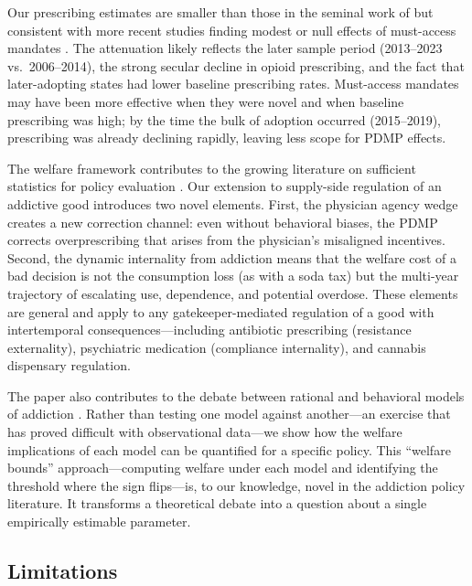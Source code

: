 \documentclass[12pt]{article}
\begin{document}
Our prescribing estimates are smaller than those in the seminal work of \citet{buchmueller2018effect} but consistent with more recent studies finding modest or null effects of must-access mandates \citep{kaestner2019effects, horwitz2021effect, dave2021mandatory, maclean2022prescription}. The attenuation likely reflects the later sample period (2013--2023 vs.\ 2006--2014), the strong secular decline in opioid prescribing, and the fact that later-adopting states had lower baseline prescribing rates. Must-access mandates may have been more effective when they were novel and when baseline prescribing was high; by the time the bulk of adoption occurred (2015--2019), prescribing was already declining rapidly, leaving less scope for PDMP effects.

The welfare framework contributes to the growing literature on sufficient statistics for policy evaluation \citep{chetty2009sufficient, allcott2019regressive, hendren2020unified, atkinson2019welfare}. Our extension to supply-side regulation of an addictive good introduces two novel elements. First, the physician agency wedge creates a new correction channel: even without behavioral biases, the PDMP corrects overprescribing that arises from the physician's misaligned incentives. Second, the dynamic internality from addiction means that the welfare cost of a bad decision is not the consumption loss (as with a soda tax) but the multi-year trajectory of escalating use, dependence, and potential overdose. These elements are general and apply to any gatekeeper-mediated regulation of a good with intertemporal consequences---including antibiotic prescribing (resistance externality), psychiatric medication (compliance internality), and cannabis dispensary regulation.

The paper also contributes to the debate between rational and behavioral models of addiction \citep{becker1988theory, gruber2001tobacco, bernheim2004addiction}. Rather than testing one model against another---an exercise that has proved difficult with observational data---we show how the welfare implications of each model can be quantified for a specific policy. This ``welfare bounds'' approach---computing welfare under each model and identifying the threshold where the sign flips---is, to our knowledge, novel in the addiction policy literature. It transforms a theoretical debate into a question about a single empirically estimable parameter.

\subsection{Limitations}\label{sec:discussion_limitations}
\end{document}
